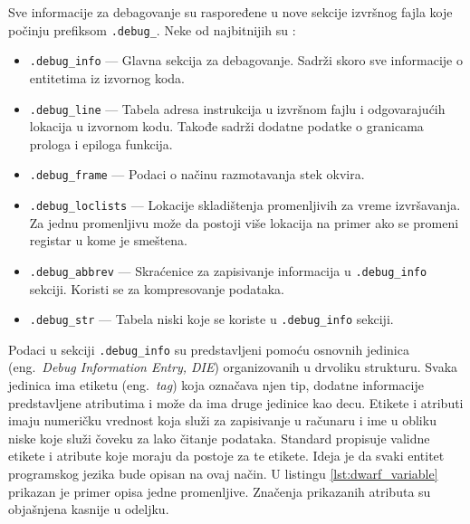 \documentclass[12pt,oneside]{memoir}
\begin{document}
Sve informacije za debagovanje su raspoređene u nove sekcije izvršnog fajla koje počinju prefiksom \verb|.debug_|.
Neke od najbitnijih su \cite{eager2012introduction_dwarf}:
\begin{itemize}
  \item \verb|.debug_info| --- Glavna sekcija za debagovanje. Sadrži skoro sve informacije o entitetima iz izvornog koda.
  \item \verb|.debug_line| --- Tabela adresa instrukcija u izvršnom fajlu i odgovarajućih lokacija u izvornom kodu. Takođe sadrži dodatne podatke o granicama prologa i epiloga funkcija.
  \item \verb|.debug_frame| --- Podaci o načinu razmotavanja stek okvira.
  \item \verb|.debug_loclists| --- Lokacije skladištenja promenljivih za vreme izvršavanja. Za jednu promenljivu može da postoji više lokacija na primer ako se promeni registar u kome je smeštena.
  \item \verb|.debug_abbrev| --- Skraćenice za zapisivanje informacija u \verb|.debug_info| sekciji. Koristi se za kompresovanje podataka. %
  \item \verb|.debug_str| --- Tabela niski koje se koriste u \verb|.debug_info| sekciji.
\end{itemize}

Podaci u sekciji \verb|.debug_info| su predstavljeni pomoću osnovnih jedinica (eng.~{\em Debug Information Entry, DIE}) organizovanih u drvoliku strukturu.
Svaka jedinica ima etiketu (eng.~{\em tag}) koja označava njen tip, dodatne informacije predstavljene atributima i može da ima druge jedinice kao decu.
Etikete i atributi imaju numeričku vrednost koja služi za zapisivanje u računaru i ime u obliku niske koje služi čoveku za lako čitanje podataka.
Standard propisuje validne etikete i atribute koje moraju da postoje za te etikete.
Ideja je da svaki entitet programskog jezika bude opisan na ovaj način.
U listingu \ref{lst:dwarf_variable} prikazan je primer opisa jedne promenljive.
Značenja prikazanih atributa su objašnjena kasnije u odeljku.
\end{document}
